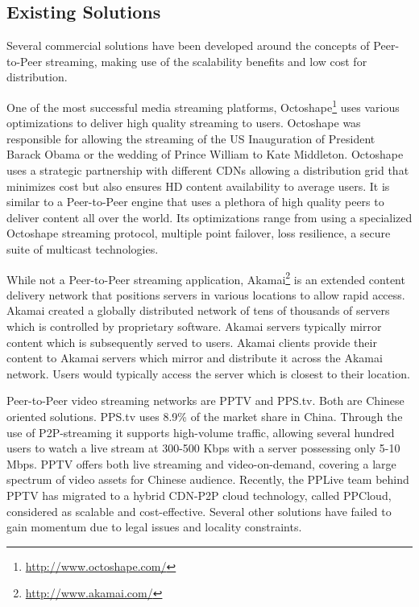 \subsection{Existing Solutions}
\label{subsec:p2p-systems:solutions}

Several commercial solutions have been developed around the concepts of
Peer-to-Peer streaming, making use of the scalability benefits and low cost
for distribution.

One of the most successful media streaming platforms,
Octoshape\footnote{\url{http://www.octoshape.com/}} uses various optimizations to
deliver high quality streaming to users.  Octoshape was responsible for
allowing the streaming of the US Inauguration of President Barack Obama or the
wedding of Prince William to Kate Middleton.  Octoshape uses a strategic
partnership with different CDNs allowing a distribution grid that minimizes
cost but also ensures HD content availability to average users. It is similar to
a Peer-to-Peer engine that uses a plethora of high quality peers to deliver
content all over the world. Its optimizations range from using a specialized
Octoshape streaming protocol, multiple point failover, loss resilience, a
secure suite of multicast technologies.

While not a Peer-to-Peer streaming application,
Akamai\footnote{\url{http://www.akamai.com/}} is an extended content delivery
network that positions servers in various locations to allow rapid access.
Akamai created a globally distributed network of tens of thousands of servers
which is controlled by proprietary software. Akamai servers typically mirror
content which is subsequently served to users. Akamai clients provide their
content to Akamai servers which mirror and distribute it across the Akamai
network. Users would typically access the server which is closest to their
location.

Peer-to-Peer video streaming networks are PPTV and PPS.tv. Both are Chinese
oriented solutions. PPS.tv uses 8.9\% of the market share in China. Through
the use of P2P-streaming it supports high-volume traffic, allowing several
hundred users to watch a live stream at 300-500 Kbps with a server possessing
only 5-10 Mbps. PPTV offers both live streaming and video-on-demand, covering
a large spectrum of video assets for Chinese audience. Recently, the PPLive
team behind PPTV has migrated to a hybrid CDN-P2P cloud technology, called
PPCloud, considered as scalable and cost-effective. Several other solutions
have failed to gain momentum due to legal issues and locality constraints.

